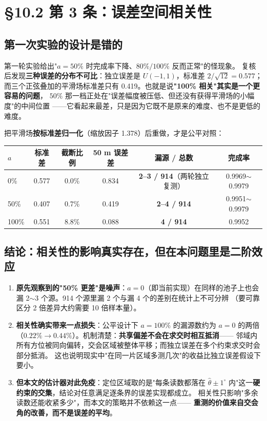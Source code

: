 \section{§10.2 第 3 条：误差空间相关性}

\subsection{第一次实验的设计是错的}

第一轮实验给出"$a=50\%$ 时完成率下降、$80\%/100\%$ 反而正常"的怪现象。
复核后发现\textbf{三种误差的分布不可比}：独立误差是 $U(-1,1)$，标准差 $2/\sqrt{12}=0.577$；
而三个正弦叠加的平滑场标准差只有 0.419。也就是说\textbf{"100\% 相关"其实是一个更容易的问题}，
$50\%$ 那一档正处在"误差幅度被压低、但还没有获得平滑场的小幅度"的中间位置
——它看起来最差，只是因为它既不是原来的难度、也不是更低的难度。

把平滑场\textbf{按标准差归一化}（缩放因子 1.378）后重做，才是公平对照：

\begin{center}
\small
\begin{tabular}{lccccc}
\toprule
$a$ & 标准差 & 截断比例 & 50 m 误差差 & 漏源 / 总数 & 完成率 \\ \midrule
0\%  & 0.577 & 0.0\% & 0.834 & \textbf{2--3 / 914}（两轮独立复测） & 0.9969$\sim$0.9979 \\
50\% & 0.407 & 0.7\% & 0.419 & \textbf{2--4 / 914} & 0.9951$\sim$0.9979 \\
100\%& 0.551 & 8.8\% & 0.088 & \textbf{4 / 914} & 0.9952 \\
\bottomrule
\end{tabular}
\end{center}

\subsection{结论：相关性的影响真实存在，但在本问题里是二阶效应}

\begin{enumerate}[leftmargin=1.8em]
  \item \textbf{原先观察到的"50\% 更差"是噪声}：$a=0$（即当前实现）在同样的池子上也会漏
        2$\sim$3 个源。914 个源里漏 2 个与漏 4 个的差别在统计上不可分辨
        （要可靠区分 2 倍差异大约需要 10 倍样本量）。
  \item \textbf{相关性确实带来一点损失}：公平设计下 $a=100\%$ 的漏源数约为 $a=0$ 的两倍
        （$0.22\%\to0.44\%$）。机制清楚：\textbf{共享偏差不会在求交时相互抵消}——
        邻域内所有方位被同向偏转，交会区域被整体平移；而独立误差在多个约束求交时会部分抵消。
        这也说明现实中"在同一片区域多测几次"的收益比独立误差假设下要小。
  \item \textbf{但本文的估计器对此免疫}：定位区域取的是"每条读数都落在
        $\hat\theta\pm1^{\circ}$ 内"这一\textbf{硬约束的交集}，结论对任意满足逐条界的误差实现都成立。
        相关性只影响"多余读数还能收紧多少"，而本文的策略并不依赖这一点——
        \textbf{重测的价值来自交会角的改善，而不是误差的平均}。
\end{enumerate}

